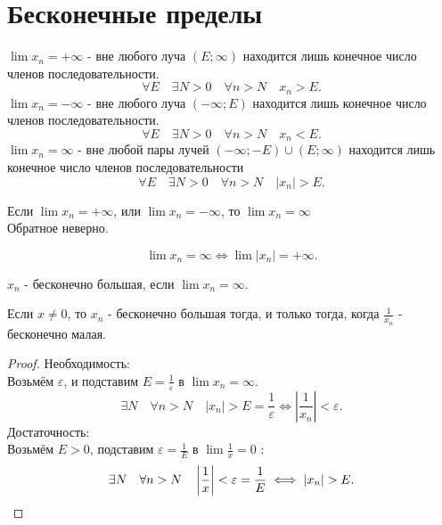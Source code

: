 \documentclass[11pt, oneside]{article}   	%
\begin{document}
\section{Бесконечные пределы}
    \begin{definition}
        $\lim x_n =+\infty$ - вне любого луча $(E; \infty)$ находится лишь конечное число членов последовательности.
        \[ \forall{E}\quad \exists{N>0}\quad \forall{n>N}\quad x_n > E .\] 
        $\lim x_n=-\infty$ - вне любого луча $(-\infty; E)$ находится лишь конечное число членов последовательности.
        \[ \forall{E}\quad \exists{N>0}\quad \forall{n>N}\quad x_n<E .\] 
        $\lim x_n = \infty$ - вне любой пары лучей $(-\infty; -E)\cup (E; \infty)$ находится лишь конечное число членов последовательности
        \[ \forall{E}\quad \exists{N>0}\quad \forall{n>N}\quad |x_n|>E .\] 
    \end{definition}
    \begin{dlemma}
        Если $\lim x_n = +\infty$, или $\lim x_n = -\infty$, то $\lim x_n = \infty$\\
        Обратное неверно.
    \end{dlemma}
    \begin{dlemma}
        \[ \lim x_n = \infty \iff \lim |x_n| = +\infty  .\] 
    \end{dlemma}
    \begin{definition}
        $x_n$ - бесконечно большая, если  $\lim x_n = \infty$.
    \end{definition}
    \begin{theorem}
        Если  $x \neq 0$, то $x_n$ - бесконечно большая тогда, и только тогда, когда  $\frac{1}{x_n}$ - бесконечно малая.
        \begin{proof}
            Необходимость:\\
            Возьмём $\varepsilon$, и подставим  $E = \frac{1}{\varepsilon}$ в $\lim x_n = \infty$.\\
            \[\exists{N}\quad \forall{n>N}\quad |x_n|>E=\frac{1}{\varepsilon} \iff \left|\frac{1}{x_n}\right| < \varepsilon .\]
            Достаточность:\\
            Возьмём $E>0$, подставим  $\varepsilon=\frac{1}{E}$ в $\lim \frac{1}{x} = 0$ :
            \[ \exists{N}\quad \forall{n>N}\quad \left|\frac{1}{x}\right|<\varepsilon=\frac{1}{E} \iff  |x_n|>E .\qedhere\] 
        \end{proof}
    \end{theorem}
\end{document}
